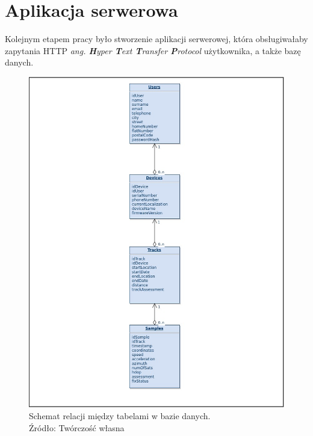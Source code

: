 \section{Aplikacja serwerowa}

Kolejnym etapem pracy było stworzenie aplikacji serwerowej, która obsługiwałaby zapytania HTTP \textit{ang. \textbf{H}yper \textbf{T}ext \textbf{T}ransfer \textbf{P}rotocol} użytkownika, a także bazę danych.



\begin{figure}[H]
	\centering
	\includegraphics[width=17cm]{img/software/database/Database_relations.jpg}
	\caption{Schemat relacji między tabelami w bazie danych. 
	\\Źródło: Twórczość własna}
	\label{fig:image_soft_db_relations}
\end{figure}